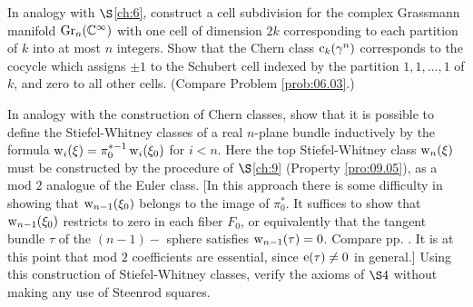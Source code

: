 \documentclass[../main]{subfiles}
\begin{document}
\begin{problem}\label{prob:14.D}In analogy with $\S $\ref{ch:6}, construct a cell subdivision for the complex Grassmann manifold $\operatorname{Gr}_{n}(\mathbb{C}^{\infty})$ with one cell of dimension $2 k$ corresponding to each partition of $k$ into at most $n$ integers. Show that the Chern class $\operatorname{c}_{k}(\gamma^{n})$ corresponds to the cocycle which assigns $\pm 1$ to the Schubert cell indexed by the partition $1,1, \ldots, 1$ of $k$, and zero to all other cells. (Compare Problem \ref{prob:06.03}.)

\end{problem} 

\begin{problem}\label{prob:14.E} In analogy with the construction of Chern classes, show that it is possible to define the Stiefel-Whitney classes of a real $n$-plane bundle inductively by the formula $\operatorname{w}_{i}(\xi)=\pi_{0}^{*-1} \operatorname{w}_{i}(\xi_{0})$ for $i<n$. Here the top Stiefel-Whitney class $\operatorname{w}_{n}(\xi)$ must be constructed by the procedure of $\S$\ref{ch:9} (Property \ref{pro:09.05}), as a mod $2$ analogue of the Euler class. [In this approach there is some difficulty in showing that $\operatorname{w}_{n-1}(\xi_{0})$ belongs to the image of $\pi_{0}^{*}$. It suffices to show that $\operatorname{w}_{n-1}(\xi_{0})$ restricts to zero in each fiber $F_{0}$, or equivalently that the tangent bundle $\tau$ of the $(n-1)-$ sphere satisfies $\operatorname{w}_{n-1}(\tau)=0$. Compare pp. \pageref{lem:04.03}. It is at this point that mod $2$ coefficients are essential, since $\operatorname{e}(\tau) \neq 0$ in general.] Using this construction of Stiefel-Whitney classes, verify the axioms of $\S 4$ without making any use of Steenrod squares.
\end{problem}
\end{document}
